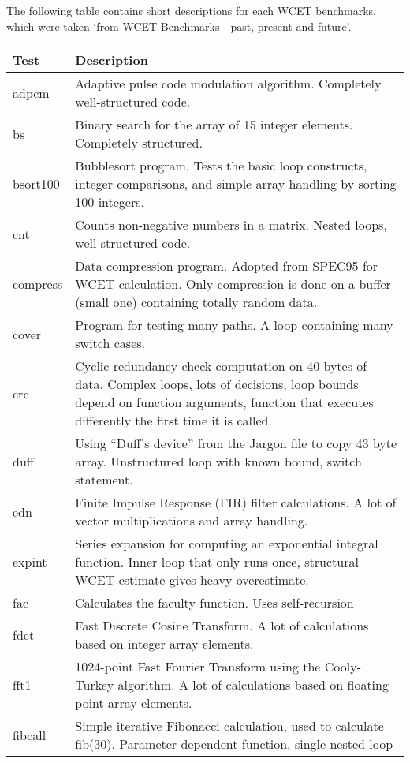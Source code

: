 \documentclass[12pt,twoside,notitlepage]{report}
\begin{document}
The following table contains short descriptions for each WCET benchmarks, which were taken `from WCET Benchmarks - past, present and future'\cite{Gustafsson:WCET2010:Benchmarks}.
\begin{longtable} { p{3cm} p{10cm}}
Test & Description\\ \midrule \midrule
\endhead

adpcm & Adaptive pulse code modulation algorithm. Completely well-structured code.\\
\midrule
bs & Binary search for the array of 15 integer elements. Completely structured.\\
\midrule
bsort100 & Bubblesort program. Tests the basic loop constructs, integer comparisons, and simple array handling by sorting 100 integers.\\ 
\midrule
cnt & Counts non-negative numbers in a matrix. 	Nested loops, well-structured code.\\
\midrule
compress & Data compression program. Adopted from SPEC95 for WCET-calculation. Only compression is done on a buffer (small one) containing totally random data.\\
\midrule
cover & Program for testing many paths. A loop containing many switch cases.\\
\midrule
crc & Cyclic redundancy check computation on 40 bytes of data. Complex loops, lots of decisions, loop bounds depend on function arguments, function that executes differently the first time it is called.\\
\midrule
duff & Using ``Duff's device'' from the Jargon file to copy 43 byte array. 	Unstructured loop with known bound, switch statement.\\
\midrule
edn & Finite Impulse Response (FIR) filter calculations. 	A lot of vector multiplications and array handling.\\
\midrule
expint & Series expansion for computing an exponential integral function. 	Inner loop that only runs once, structural WCET estimate gives heavy overestimate.\\
\midrule
 fac & Calculates the faculty function. Uses self-recursion\\
\midrule
fdct & Fast Discrete Cosine Transform. A lot of calculations based on integer array elements.\\
\midrule
fft1 & 1024-point Fast Fourier Transform using the Cooly-Turkey algorithm. 	A lot of calculations based on floating point array elements.\\
\midrule
fibcall & Simple iterative Fibonacci calculation, used to calculate fib(30). Parameter-dependent function, single-nested loop\\

\end{longtable}
\end{document}
